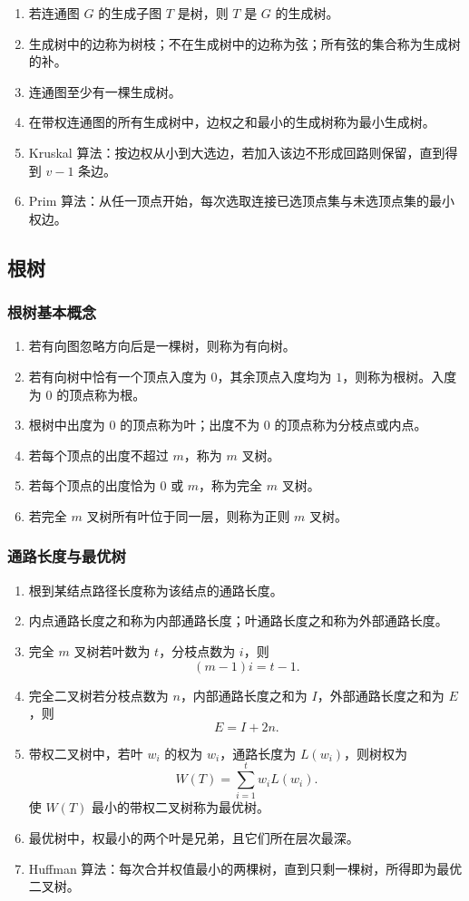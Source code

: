 \begin{enumerate}
	\item 若连通图 \(G\) 的生成子图 \(T\) 是树，则 \(T\) 是 \(G\) 的生成树。
	\item 生成树中的边称为树枝；不在生成树中的边称为弦；所有弦的集合称为生成树的补。
	\item 连通图至少有一棵生成树。
	\item 在带权连通图的所有生成树中，边权之和最小的生成树称为最小生成树。
	\item Kruskal 算法：按边权从小到大选边，若加入该边不形成回路则保留，直到得到 \(v-1\) 条边。
	\item Prim 算法：从任一顶点开始，每次选取连接已选顶点集与未选顶点集的最小权边。
\end{enumerate}

\subsection{根树}

\subsubsection{根树基本概念}

\begin{enumerate}
	\item 若有向图忽略方向后是一棵树，则称为有向树。
	\item 若有向树中恰有一个顶点入度为 \(0\)，其余顶点入度均为 \(1\)，则称为根树。入度为 \(0\) 的顶点称为根。
	\item 根树中出度为 \(0\) 的顶点称为叶；出度不为 \(0\) 的顶点称为分枝点或内点。
	\item 若每个顶点的出度不超过 \(m\)，称为 \(m\) 叉树。
	\item 若每个顶点的出度恰为 \(0\) 或 \(m\)，称为完全 \(m\) 叉树。
	\item 若完全 \(m\) 叉树所有叶位于同一层，则称为正则 \(m\) 叉树。
\end{enumerate}

\subsubsection{通路长度与最优树}

\begin{enumerate}
	\item 根到某结点路径长度称为该结点的通路长度。
	\item 内点通路长度之和称为内部通路长度；叶通路长度之和称为外部通路长度。
	\item 完全 \(m\) 叉树若叶数为 \(t\)，分枝点数为 \(i\)，则
	\[
	(m-1)i=t-1.
	\]
	\item 完全二叉树若分枝点数为 \(n\)，内部通路长度之和为 \(I\)，外部通路长度之和为 \(E\)，则
	\[
	E=I+2n.
	\]
	\item 带权二叉树中，若叶 \(w_i\) 的权为 \(w_i\)，通路长度为 \(L(w_i)\)，则树权为
	\[
	W(T)=\sum_{i=1}^{t}w_iL(w_i).
	\]
	使 \(W(T)\) 最小的带权二叉树称为最优树。
	\item 最优树中，权最小的两个叶是兄弟，且它们所在层次最深。
	\item Huffman 算法：每次合并权值最小的两棵树，直到只剩一棵树，所得即为最优二叉树。
\end{enumerate}

